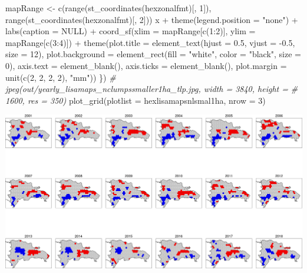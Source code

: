 \documentclass[10pt,landscape,a3paper]{article}
\newenvironment{Shaded}{\begin{snugshade}}{\end{snugshade}}
\newcommand{\AttributeTok}[1]{\textcolor[rgb]{0.77,0.63,0.00}{#1}}
\newcommand{\CommentTok}[1]{\textcolor[rgb]{0.56,0.35,0.01}{\textit{#1}}}
\newcommand{\ConstantTok}[1]{\textcolor[rgb]{0.00,0.00,0.00}{#1}}
\newcommand{\DecValTok}[1]{\textcolor[rgb]{0.00,0.00,0.81}{#1}}
\newcommand{\FloatTok}[1]{\textcolor[rgb]{0.00,0.00,0.81}{#1}}
\newcommand{\FunctionTok}[1]{\textcolor[rgb]{0.00,0.00,0.00}{#1}}
\newcommand{\NormalTok}[1]{#1}
\newcommand{\OtherTok}[1]{\textcolor[rgb]{0.56,0.35,0.01}{#1}}
\newcommand{\SpecialCharTok}[1]{\textcolor[rgb]{0.00,0.00,0.00}{#1}}
\newcommand{\StringTok}[1]{\textcolor[rgb]{0.31,0.60,0.02}{#1}}
\begin{document}
\begin{Shaded}
\begin{Highlighting}[]
\NormalTok{    mapRange }\OtherTok{\textless{}{-}} \FunctionTok{c}\NormalTok{(}\FunctionTok{range}\NormalTok{(}\FunctionTok{st\_coordinates}\NormalTok{(hexzonalfmt)[, }\DecValTok{1}\NormalTok{]), }\FunctionTok{range}\NormalTok{(}\FunctionTok{st\_coordinates}\NormalTok{(hexzonalfmt)[,}
        \DecValTok{2}\NormalTok{]))}
\NormalTok{    x }\SpecialCharTok{+} \FunctionTok{theme}\NormalTok{(}\AttributeTok{legend.position =} \StringTok{"none"}\NormalTok{) }\SpecialCharTok{+} \FunctionTok{labs}\NormalTok{(}\AttributeTok{caption =} \ConstantTok{NULL}\NormalTok{) }\SpecialCharTok{+} \FunctionTok{coord\_sf}\NormalTok{(}\AttributeTok{xlim =}\NormalTok{ mapRange[}\FunctionTok{c}\NormalTok{(}\DecValTok{1}\SpecialCharTok{:}\DecValTok{2}\NormalTok{)],}
        \AttributeTok{ylim =}\NormalTok{ mapRange[}\FunctionTok{c}\NormalTok{(}\DecValTok{3}\SpecialCharTok{:}\DecValTok{4}\NormalTok{)]) }\SpecialCharTok{+} \FunctionTok{theme}\NormalTok{(}\AttributeTok{plot.title =} \FunctionTok{element\_text}\NormalTok{(}\AttributeTok{hjust =} \FloatTok{0.5}\NormalTok{, }\AttributeTok{vjust =} \SpecialCharTok{{-}}\FloatTok{0.5}\NormalTok{,}
        \AttributeTok{size =} \DecValTok{12}\NormalTok{), }\AttributeTok{plot.background =} \FunctionTok{element\_rect}\NormalTok{(}\AttributeTok{fill =} \StringTok{"white"}\NormalTok{, }\AttributeTok{color =} \StringTok{"black"}\NormalTok{,}
        \AttributeTok{size =} \DecValTok{0}\NormalTok{), }\AttributeTok{axis.text =} \FunctionTok{element\_blank}\NormalTok{(), }\AttributeTok{axis.ticks =} \FunctionTok{element\_blank}\NormalTok{(), }\AttributeTok{plot.margin =} \FunctionTok{unit}\NormalTok{(}\FunctionTok{c}\NormalTok{(}\DecValTok{2}\NormalTok{,}
        \DecValTok{2}\NormalTok{, }\DecValTok{2}\NormalTok{, }\DecValTok{2}\NormalTok{), }\StringTok{"mm"}\NormalTok{))}
\NormalTok{\})}
\CommentTok{\# jpeg(\textquotesingle{}out/yearly\_lisamaps\_nclumpssmaller1ha\_tlp.jpg\textquotesingle{}, width = 3840, height =}
\CommentTok{\# 1600, res = 350)}
\FunctionTok{plot\_grid}\NormalTok{(}\AttributeTok{plotlist =}\NormalTok{ hexlisamapsnlsmal1ha, }\AttributeTok{nrow =} \DecValTok{3}\NormalTok{)}
\end{Highlighting}
\end{Shaded}

\begin{center}\includegraphics{img/modelling/aa-lisa-maps-2} \end{center}
\end{document}
